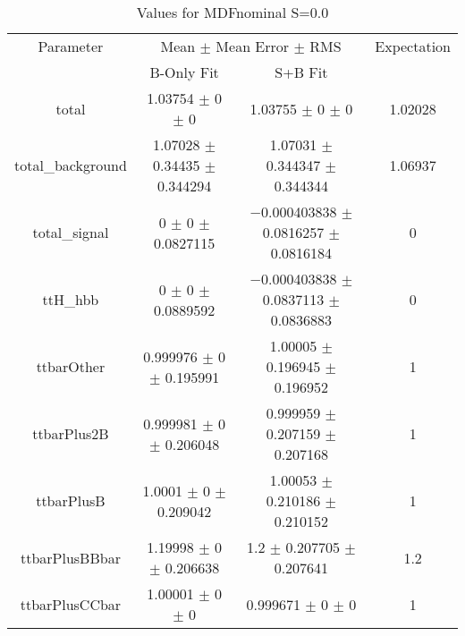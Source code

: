 \begin{table}
\centering
\caption{Values for MDFnominal S=0.0}
\begin{tabular}{cccc}
\toprule
Parameter & \multicolumn{2}{c}{Mean $\pm$ Mean Error $\pm$ RMS} & Expectation\\
 & B-Only Fit & S+B Fit & \\
\midrule
total & \num{1.03754} $\pm$ \num{0} $\pm$ \num{0} & \num{1.03755} $\pm$ \num{0} $\pm$ \num{0} & \num{1.02028}\\
total\_background & \num{1.07028} $\pm$ \num{0.34435} $\pm$ \num{0.344294} & \num{1.07031} $\pm$ \num{0.344347} $\pm$ \num{0.344344} & \num{1.06937}\\
total\_signal & \num{0} $\pm$ \num{0} $\pm$ \num{0.0827115} & \num{-0.000403838} $\pm$ \num{0.0816257} $\pm$ \num{0.0816184} & \num{0}\\
ttH\_hbb & \num{0} $\pm$ \num{0} $\pm$ \num{0.0889592} & \num{-0.000403838} $\pm$ \num{0.0837113} $\pm$ \num{0.0836883} & \num{0}\\
ttbarOther & \num{0.999976} $\pm$ \num{0} $\pm$ \num{0.195991} & \num{1.00005} $\pm$ \num{0.196945} $\pm$ \num{0.196952} & \num{1}\\
ttbarPlus2B & \num{0.999981} $\pm$ \num{0} $\pm$ \num{0.206048} & \num{0.999959} $\pm$ \num{0.207159} $\pm$ \num{0.207168} & \num{1}\\
ttbarPlusB & \num{1.0001} $\pm$ \num{0} $\pm$ \num{0.209042} & \num{1.00053} $\pm$ \num{0.210186} $\pm$ \num{0.210152} & \num{1}\\
ttbarPlusBBbar & \num{1.19998} $\pm$ \num{0} $\pm$ \num{0.206638} & \num{1.2} $\pm$ \num{0.207705} $\pm$ \num{0.207641} & \num{1.2}\\
ttbarPlusCCbar & \num{1.00001} $\pm$ \num{0} $\pm$ \num{0} & \num{0.999671} $\pm$ \num{0} $\pm$ \num{0} & \num{1}\\
\bottomrule
\end{tabular}
\end{table}